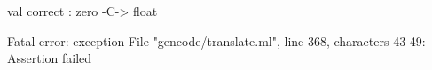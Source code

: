 \chklistingfalse
{}
\begin{ChkListingMsg}
val correct : zero -C-> float 
\end{ChkListingMsg}
\begin{ChkListingErr}
Fatal error: exception File "gencode/translate.ml", line 368, characters 43-49: Assertion failed
\end{ChkListingErr}
